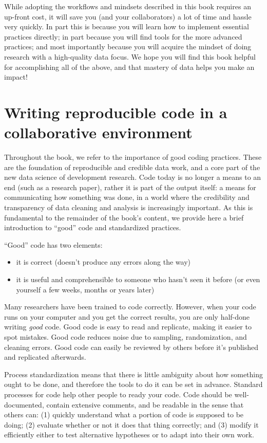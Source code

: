 While adopting the workflows and mindsets described in this book requires an up-front cost,
it will save you (and your collaborators) a lot of time and hassle very quickly.
In part this is because you will learn how to implement essential practices directly;
in part because you will find tools for the more advanced practices;
and most importantly because you will acquire the mindset of doing research with a high-quality data focus.
We hope you will find this book helpful for accomplishing all of the above,
and that mastery of data helps you make an impact!


\section{Writing reproducible code in a collaborative environment}
Throughout the book, we refer to the importance of good coding practices. 
These are the foundation of reproducible and credible data work,
and a core part of the new data science of development research.
Code today is no longer a means to an end (such as a research paper),
rather it is part of the output itself: a means for communicating how something was done,
in a world where the credibility and transparency of data cleaning and analysis is increasingly important.
As this is fundamental to the remainder of the book's content, 
we provide here a brief introduction to ``good'' code and standardized practices.

``Good'' code has two elements:
\begin{itemize}
\item it is correct (doesn't produce any errors along the way)
\item it is useful and comprehensible to someone who hasn't seen it before (or even yourself a few weeks, months or years later)
\end{itemize}

Many researchers have been trained to code correctly. 
However, when your code runs on your computer and you get the correct results, you are only half-done writing \textit{good} code.
Good code is easy to read and replicate, making it easier to spot mistakes.
Good code reduces noise due to sampling, randomization, and cleaning errors.
Good code can easily be reviewed by others before it's published and replicated afterwards.

Process standardization means that there is
little ambiguity about how something ought to be done,
and therefore the tools to do it can be set in advance.
Standard processes for code help other people to ready your code. 
Code should be well-documented, contain extensive comments, and be readable in the sense that others can:
(1) quickly understand what a portion of code is supposed to be doing;
(2) evaluate whether or not it does that thing correctly; and
(3) modify it efficiently either to test alternative hypotheses
or to adapt into their own work.

